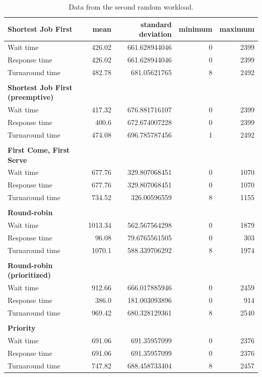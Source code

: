 \documentclass[12pt,letterpaper]{article}
\begin{document}
\begin{appendices}
				\begin{table}[H]
		  			\caption{Data from the second random workload.}
			  		\begin{tabular}{l r r r r}
						\textbf{Shortest Job First} & mean & standard deviation & minimum & maximum\\
						\hline
	Wait time &		426.02 &	661.628944046 &	0 &	2399	\\
	Response time &		426.02 &	661.628944046 &	0 &	2399 	\\
	Turnaround time &	482.78 &	681.05621765 &	8 &	2492 	\\
						\\
						\textbf{Shortest Job First (preemptive)} \\
						\hline
	Wait time &		417.32 &	676.881716107 &	0 &	2399	\\
	Response time &		400.6 &	672.674007228 &	0 &	2399 	\\
	Turnaround time &	474.08 &	696.785787456 &	1 &	2492 	\\
						\\
						\textbf{First Come, First Serve} \\
						\hline
	Wait time &		677.76 &	329.807068451 &	0 &	1070 	\\
	Response time &		677.76 &	329.807068451 &	0 &	1070 	\\
	Turnaround time &	734.52 &	326.00596559 &	8 &	1155 	\\
						\\
						\textbf{Round-robin} \\
						\hline
	Wait time &		1013.34 &	562.567564298 &	0 &	1879	\\
	Response time &		96.08 &	79.6765561505 &	0 &	303 	\\
	Turnaround time &	1070.1 &	588.339706292 &	8 &	1974 	\\
						\\
						\textbf{Round-robin (prioritized)} \\
						\hline
	Wait time &		912.66 &	666.017885946 &	0 &	2459 	\\
	Response time &		386.0 &	181.003093896 &	0 &	914 	\\
	Turnaround time &	969.42 &	680.328129361 &	8 &	2540 	\\
						\\
						\textbf{Priority} \\
						\hline
	Wait time &		691.06 &	691.35957099 &	0 &	2376 	\\
	Response time &		691.06 &	691.35957099 &	0 &	2376 	\\
	Turnaround time &	747.82 &	688.458733404 &	8 &	2457 	\\


\end{tabular}
\end{table}
\end{appendices}
\end{document}
